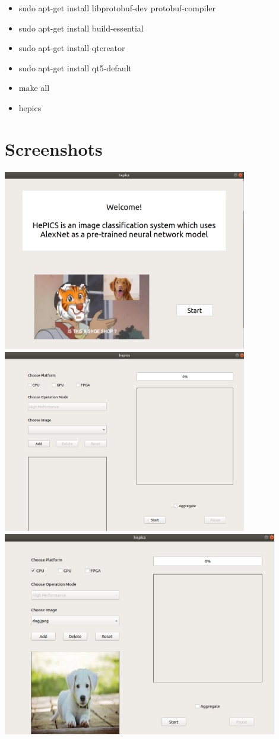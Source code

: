 \documentclass[parskip=full]{scrartcl}
\begin{document}
\begin{itemize}
	\item sudo apt-get install libprotobuf-dev protobuf-compiler
	\item  sudo apt-get install build-essential
	\item sudo apt-get install qtcreator 
	\item sudo apt-get install qt5-default
	\item make all
	\item hepics
\end{itemize}

\section {Screenshots}
\includegraphics[width=0.80\textwidth, center]{screen1}
\pagebreak
\includegraphics[width=0.80\textwidth, center]{screen2}
\includegraphics[width=0.9\textwidth, center]{screen3}
\end{document}
